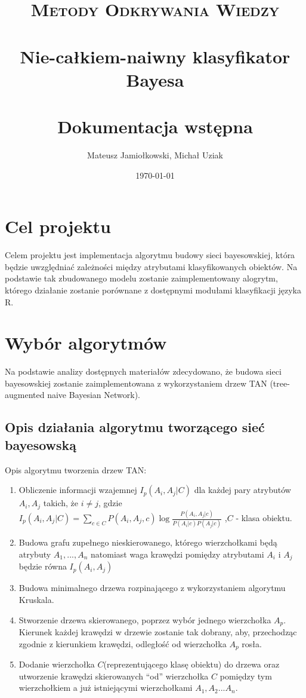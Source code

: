 \documentclass[paper=a4, fontsize=11pt]{scrartcl} %
\title{	
\normalfont \normalsize 
\textsc{Metody Odkrywania Wiedzy} \\ [25pt] %
\horrule{0.5pt} \\[0.4cm] %
\huge Nie-całkiem-naiwny klasyfikator Bayesa \\ %
\horrule{2pt} \\[0.5cm] %
\LARGE Dokumentacja wstępna
}%
\author{Mateusz Jamiołkowski, Michał Uziak} %
\date{\normalsize\today} %
\numberwithin{equation}{section} %
\numberwithin{figure}{section} %
\numberwithin{table}{section} %
\begin{document}
\maketitle %


\section{Cel projektu}

Celem projektu jest implementacja algorytmu budowy sieci bayesowskiej, która będzie uwzględniać zależności między atrybutami klasyfikowanych obiektów. Na podstawie tak zbudowanego modelu zostanie zaimplementowany alogrytm, którego działanie zostanie porównane z dostępnymi modułami klasyfikacji języka R.

\section{Wybór algorytmów}
Na podstawie analizy dostępnych materiałów zdecydowano, że budowa sieci bayesowskiej zostanie zaimplementowana z wykorzystaniem drzew TAN (tree-augmented naive Bayesian Network). 

\subsection{Opis działania algorytmu tworzącego sieć bayesowską}



Opis algorytmu tworzenia drzew TAN:
\begin{enumerate}
 \item Obliczenie informacji wzajemnej $I_p(A_i,A_j|C)$ dla każdej pary atrybutów $A_i, A_j$ takich, że $i\neq j $, gdzie 
 $I_p(A_i,A_j|C)= \sum_{c \in C}^{} {P(A_i,A_j,c) \log\frac{P(A_i,A_j|c)}{P(A_i|c)P(A_j|c)} } $ ,$C$ - klasa obiektu.
 
 \item  Budowa grafu zupełnego nieskierowanego, którego wierzchołkami będą atrybuty $A_1,... ,A_n$ natomiast waga krawędzi pomiędzy atrybutami $A_i$ i $A_j$ 		będzie równa $I_p(A_i,A_j)$
 
 \item  Budowa minimalnego drzewa rozpinającego z wykorzystaniem algorytmu Kruskala.
 \item  Stworzenie drzewa skierowanego, poprzez wybór jednego wierzchołka $A_p$. Kierunek każdej krawędzi w drzewie zostanie tak dobrany, aby, przechodząc zgodnie z kierunkiem krawędzi, odległość od wierzchołka $A_p$ rosła.
 \item Dodanie wierzchołka $C$(reprezentującego klasę obiektu) do drzewa oraz utworzenie krawędzi skierowanych “od” wierzchołka $C$ pomiędzy tym wierzchołkiem a już istniejącymi wierzchołkami $A_1,A_2...A_n$.
 
\end{enumerate}
\end{document}
